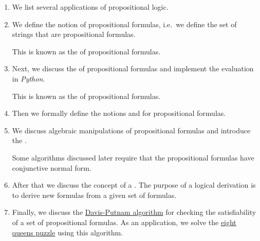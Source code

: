 \begin{enumerate}
\item We list several applications of propositional logic.
\item We define the notion of propositional formulas, i.e.~we define the set of strings that are
      propositional formulas.

      This is known as the  of propositional formulas.
\item Next, we discuss the  of propositional formulas and implement the evaluation in \textsl{Python}.

      This is known as the  of propositional formulas.
\item Then we formally define the notions  and  for propositional formulas.   
\item We discuss algebraic manipulations of propositional formulas and introduce the 
      .

      Some algorithms discussed later require that the propositional formulas have conjunctive normal form.
\item After that we discuss the concept of a .  The purpose of a logical derivation is to
      derive new formulas from a given set of formulas.
\item Finally, we discuss the \href{https://en.wikipedia.org/wiki/Davis–Putnam_algorithm}{Davis-Putnam
      algorithm} for checking the satisfiability of a set of  propositional formulas.  As an application, we
      solve the \href{https://en.wikipedia.org/wiki/Eight_queens_puzzle}{eight queens puzzle} using this algorithm.
\end{enumerate}

